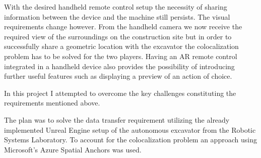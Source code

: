 With the desired handheld remote control setup the necessity of sharing information between the device and the machine still persists. The visual requirements change however. From the handheld camera we now receive the required view of the surroundings on the construction site but in order to successfully share a geometric location with the excavator the colocalization problem has to be solved for the two players. Having an AR remote control integrated in a handheld device also provides the possibility of introducing further useful features such as displaying a preview of an action of choice. 

In this project I attempted to overcome the key challenges constituting the requirements mentioned above. 

The plan was to solve the data transfer requirement utilizing the already implemented Unreal Engine setup of the autonomous excavator from the Robotic Systems Laboratory. To account for the colocalization problem an approach using Microsoft's Azure Spatial Anchors was used.